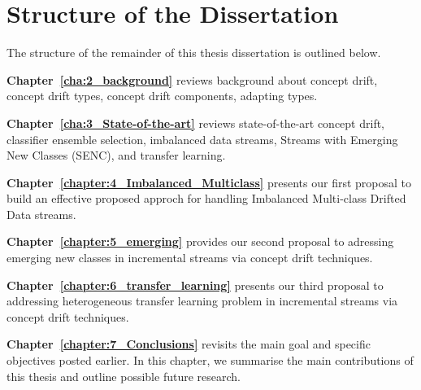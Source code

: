 
\section{Structure of the Dissertation}
\label{sec:1_introduction_organizations}
The structure of the remainder of this thesis dissertation is outlined below.
\begin{description}	
	\item \textbf{Chapter~\ref{cha:2_background}} reviews background about concept drift, concept drift types, concept drift components, adapting types.  
	
	\item \textbf{Chapter~\ref{cha:3_State-of-the-art}} reviews state-of-the-art  concept drift, classifier ensemble selection, imbalanced data streams, Streams with Emerging New Classes (SENC), and transfer learning.  
	
	\item \textbf{Chapter~\ref{chapter:4_Imbalanced_Multiclass}
	} presents our first proposal to build an effective proposed approch for  handling Imbalanced Multi-class Drifted Data streams.
	
	\item \textbf{Chapter~\ref{chapter:5_emerging}} provides our second proposal to adressing emerging new classes in incremental streams via concept drift techniques. 
	
	\item \textbf{Chapter~\ref{chapter:6_transfer_learning}} presents our third proposal to addressing heterogeneous transfer learning problem  in incremental streams via concept drift techniques.
	
	\item \textbf{Chapter~\ref{chapter:7_Conclusions}} revisits the main goal and specific objectives posted earlier. In this chapter, we summarise the main contributions of this thesis and outline possible future research.


\end{description}